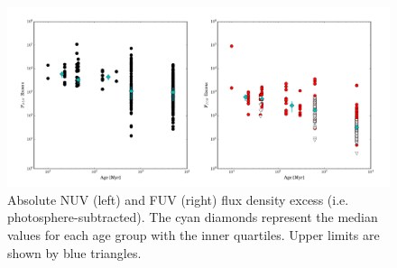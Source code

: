 \documentclass[twocolumn]{aastex62}
\begin{document}
\begin{figure}[t]
\centering
\includegraphics[width=0.95\linewidth]{ffdensity_age_NO_J.pdf}
\caption{Absolute NUV (left) and FUV (right) flux density excess (i.e. photosphere-subtracted). The cyan diamonds represent the median values for each age group with the inner quartiles. Upper limits are shown by blue triangles.  \label{fig:ffdensity_age}}
\end{figure}
\end{document}
